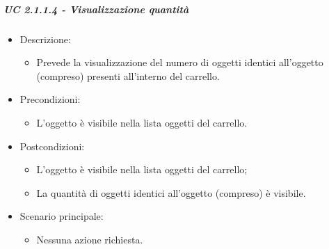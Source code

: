 \subparagraph{UC 2.1.1.4 - Visualizzazione quantità}
\begin{itemize}
	
	\item Descrizione:
	\begin{itemize}
		\item Prevede la visualizzazione del numero di oggetti identici all'oggetto (compreso) presenti all'interno del carrello.
	\end{itemize}
	
	\item Precondizioni:
	\begin{itemize}
		\item L'oggetto è visibile nella lista oggetti del carrello.
	\end{itemize}
	
	\item Postcondizioni:
	\begin{itemize}
		\item L'oggetto è visibile nella lista oggetti del carrello;
		\item La quantità di oggetti identici all'oggetto (compreso) è visibile.
	\end{itemize}
	
	\item Scenario principale:
	\begin{itemize}
		\item Nessuna azione richiesta.
	\end{itemize}
	
\end{itemize}

